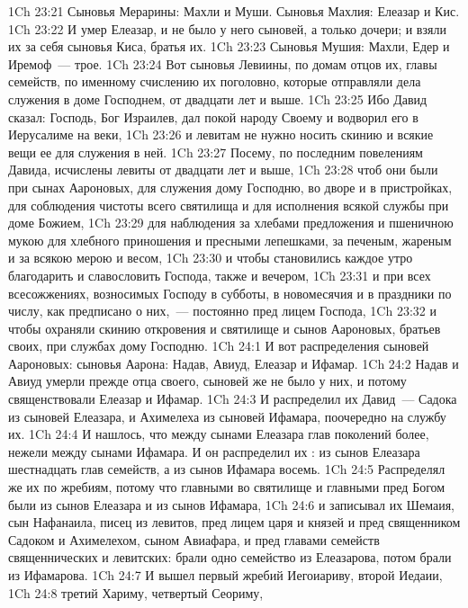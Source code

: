 \vs 1Ch 23:21 Сыновья Мерарины: Махли и Муши. Сыновья Махлия: Елеазар и Кис.
\vs 1Ch 23:22 И умер Елеазар, и не было у него сыновей, а только дочери; и взяли их за себя сыновья Киса, братья их.
\vs 1Ch 23:23 Сыновья Мушия: Махли, Едер и Иремоф~--- трое.
\vs 1Ch 23:24 Вот сыновья Левиины, по домам отцов их, главы семейств, по именному счислению их поголовно, которые отправляли дела служения в доме Господнем, от двадцати лет и выше.
\vs 1Ch 23:25 Ибо Давид сказал: Господь, Бог Израилев, дал покой народу Своему и водворил его в Иерусалиме на веки,
\vs 1Ch 23:26 и левитам не нужно носить скинию и всякие вещи ее для служения в ней.
\rsbpar\vs 1Ch 23:27 Посему, по последним повелениям Давида, исчислены левиты от двадцати лет и выше,
\vs 1Ch 23:28 чтоб они были при сынах Аароновых, для служения дому Господню, во дворе и в пристройках, для соблюдения чистоты всего святилища и для исполнения всякой службы при доме Божием,
\vs 1Ch 23:29 для наблюдения за хлебами предложения и пшеничною мукою для хлебного приношения и пресными лепешками, за печеным, жареным и за всякою мерою и весом,
\vs 1Ch 23:30 и чтобы становились каждое утро благодарить и славословить Господа, также и вечером,
\vs 1Ch 23:31 и при всех всесожжениях, возносимых Господу в субботы, в новомесячия и в праздники по числу, как предписано о них,~--- постоянно пред лицем Господа,
\vs 1Ch 23:32 и чтобы охраняли скинию откровения и святилище и сынов Аароновых, братьев своих, при службах дому Господню.
\vs 1Ch 24:1 И вот распределения сыновей Аароновых: сыновья Аарона: Надав, Авиуд, Елеазар и Ифамар.
\vs 1Ch 24:2 Надав и Авиуд умерли прежде отца своего, сыновей же не было у них, и потому священствовали Елеазар и Ифамар.
\vs 1Ch 24:3 И распределил их Давид~--- Садока из сыновей Елеазара, и Ахимелеха из сыновей Ифамара, поочередно на службу их.
\vs 1Ch 24:4 И нашлось, что между сынами Елеазара глав поколений более, нежели между сынами Ифамара. И он распределил их : из сынов Елеазара шестнадцать глав семейств, а из сынов Ифамара восемь.
\vs 1Ch 24:5 Распределял же их по жребиям, потому что главными во святилище и главными пред Богом были из сынов Елеазара и из сынов Ифамара,
\vs 1Ch 24:6 и записывал их Шемаия, сын Нафанаила, писец из левитов, пред лицем царя и князей и пред священником Садоком и Ахимелехом, сыном Авиафара, и пред главами семейств священнических и левитских: брали  одно семейство из  Елеазарова, потом брали из  Ифамарова.
\vs 1Ch 24:7 И вышел первый жребий Иегоиариву, второй Иедаии,
\vs 1Ch 24:8 третий Хариму, четвертый Сеориму,
